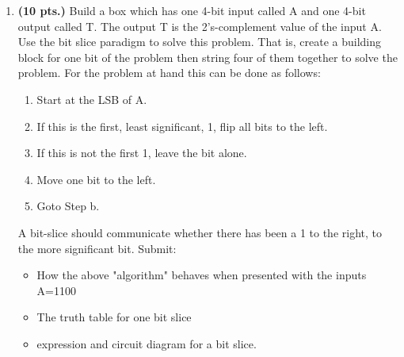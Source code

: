 \begin{enumerate}
            \filbreak %
        \item \textbf{(10 pts.)} Build a box which has one 4-bit input called A and
            one 4-bit output called T. The output T is the 2's-complement value
            of the input A.  Use the bit slice paradigm to solve this
            problem.  That is, create a building block for one bit of the problem
            then string four of them together to solve the problem.
            For the problem at hand this can be done as follows:
            \begin{enumerate}
                \item Start at the LSB of A.
                \item If this is the first, least significant, 1, flip all bits
                    to the left.
                \item If this is not the first 1, leave the bit alone.
                \item Move one bit to the left.
                \item Goto Step b.
            \end{enumerate}
            A bit-slice should communicate whether there has been a 1 to the right,
            to the more significant bit.  Submit:
            \begin{itemize}
                \item How the above "algorithm" behaves when presented with
                    the inputs A=1100
                \item The truth table for one bit slice
                    \begin{onlysolution}

                    \end{onlysolution}
                \item \SOPmin expression and circuit diagram for a bit slice.
                    \begin{onlysolution}


\end{onlysolution}
\end{itemize}
\end{enumerate}
